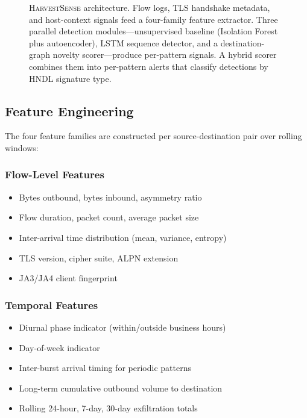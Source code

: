 \documentclass[sigconf,nonacm]{acmart}
\begin{document}
\begin{figure}[t]
\caption{\textsc{HarvestSense} architecture. Flow logs, TLS handshake
  metadata, and host-context signals feed a four-family feature
  extractor. Three parallel detection modules---unsupervised baseline
  (Isolation Forest plus autoencoder), LSTM sequence detector, and a
  destination-graph novelty scorer---produce per-pattern signals. A
  hybrid scorer combines them into per-pattern alerts that classify
  detections by HNDL signature type.}
\label{fig:framework}
\end{figure}

\subsection{Feature Engineering}

The four feature families are constructed per source-destination pair
over rolling windows:

\subsubsection{Flow-Level Features}

\begin{itemize}
  \item Bytes outbound, bytes inbound, asymmetry ratio
  \item Flow duration, packet count, average packet size
  \item Inter-arrival time distribution (mean, variance, entropy)
  \item TLS version, cipher suite, ALPN extension
  \item JA3/JA4 client fingerprint
\end{itemize}

\subsubsection{Temporal Features}

\begin{itemize}
  \item Diurnal phase indicator (within/outside business hours)
  \item Day-of-week indicator
  \item Inter-burst arrival timing for periodic patterns
  \item Long-term cumulative outbound volume to destination
  \item Rolling 24-hour, 7-day, 30-day exfiltration totals
\end{itemize}
\end{document}
